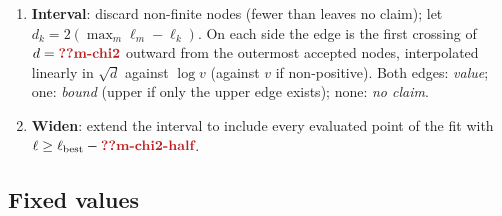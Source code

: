 \begin{enumerate}[leftmargin=2em,itemsep=1pt]
  \item \textbf{Interval}: discard non-finite nodes (fewer than  leaves no claim); let $d_k=2(\max_m\ell_m-\ell_k)$. On each side the edge is the first crossing of $d=\C{m-chi2}$ outward from the outermost accepted nodes, interpolated linearly in $\sqrt d$ against $\log v$ (against $v$ if non-positive). Both edges: \emph{value}; one: \emph{bound} (upper if only the upper edge exists); none: \emph{no claim}.
  \item \textbf{Widen}: extend the interval to include every evaluated point of the fit with $\ell\ge\ell_{\rm best}-\C{m-chi2-half}$.
\end{enumerate}

\subsection{Fixed values}

